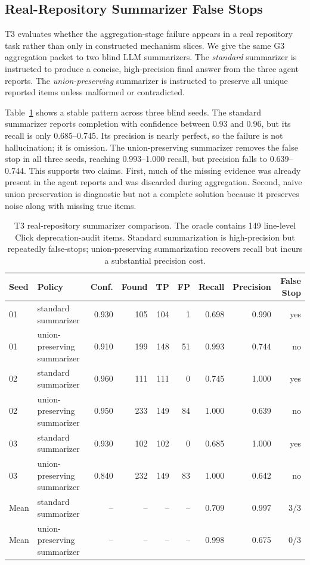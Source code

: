 \documentclass[letterpaper]{article}
\begin{document}
\subsection{Real-Repository Summarizer False Stops}

T3 evaluates whether the aggregation-stage failure appears in a real repository
task rather than only in constructed mechanism slices. We give the same G3
aggregation packet to two blind LLM summarizers. The \emph{standard} summarizer
is instructed to produce a concise, high-precision final answer from the three
agent reports. The \emph{union-preserving} summarizer is instructed to preserve
all unique reported items unless malformed or contradicted.

Table~\ref{tab:t3-summarizers} shows a stable pattern across three blind seeds.
The standard summarizer reports completion with confidence between 0.93 and
0.96, but its recall is only 0.685--0.745. Its precision is nearly perfect, so
the failure is not hallucination; it is omission. The union-preserving
summarizer removes the false stop in all three seeds, reaching 0.993--1.000
recall, but precision falls to 0.639--0.744. This supports two claims. First,
much of the missing evidence was already present in the agent reports and was
discarded during aggregation. Second, naive union preservation is diagnostic but
not a complete solution because it preserves noise along with missing true
items.

\begin{table}[t]
\centering
\small
\begin{tabular}{llrrrrrrr}
\toprule
Seed & Policy & Conf. & Found & TP & FP & Recall & Precision & False Stop \\
\midrule
01 & standard summarizer & 0.930 & 105 & 104 & 1 & 0.698 & 0.990 & yes \\
01 & union-preserving summarizer & 0.910 & 199 & 148 & 51 & 0.993 & 0.744 & no \\
02 & standard summarizer & 0.960 & 111 & 111 & 0 & 0.745 & 1.000 & yes \\
02 & union-preserving summarizer & 0.950 & 233 & 149 & 84 & 1.000 & 0.639 & no \\
03 & standard summarizer & 0.930 & 102 & 102 & 0 & 0.685 & 1.000 & yes \\
03 & union-preserving summarizer & 0.840 & 232 & 149 & 83 & 1.000 & 0.642 & no \\
\midrule
Mean & standard summarizer & -- & -- & -- & -- & 0.709 & 0.997 & 3/3 \\
Mean & union-preserving summarizer & -- & -- & -- & -- & 0.998 & 0.675 & 0/3 \\
\bottomrule
\end{tabular}
\caption{T3 real-repository summarizer comparison. The oracle contains 149
line-level Click deprecation-audit items. Standard summarization is
high-precision but repeatedly false-stops; union-preserving summarization
recovers recall but incurs a substantial precision cost.}
\label{tab:t3-summarizers}
\end{table}
\end{document}
